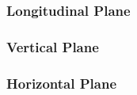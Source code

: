 \documentclass[
	12pt,				%
	openright,			%
	oneside,			%
	a4paper,		%
	chapter=TITLE,		%
	section=TITLE,		%
    brazil,				%
	english,			%
	sumario=tradicional,
	]{abntex2}
\begin{document}
      \subsubsection{Longitudinal Plane}
      \subsubsection{Vertical Plane}
      \subsubsection{Horizontal Plane}


    
    
	
    




	\postextual
	
\end{document}
